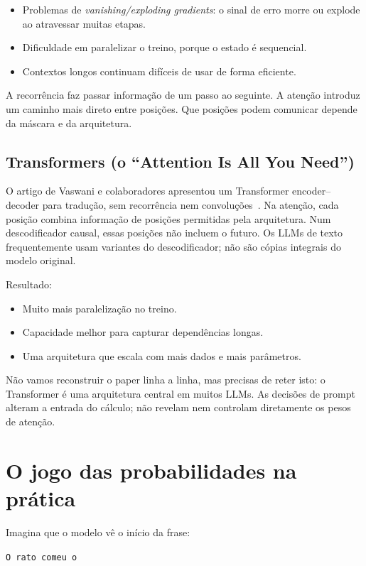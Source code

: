 \begin{itemize}[leftmargin=*]
\item Problemas de \emph{vanishing/exploding gradients}: o sinal de erro morre ou explode ao atravessar muitas etapas.
\item Dificuldade em paralelizar o treino, porque o estado é sequencial.
\item Contextos longos continuam difíceis de usar de forma eficiente.
\end{itemize}

A recorrência faz passar informação de um passo ao seguinte. A atenção introduz um caminho mais direto entre posições. Que posições podem comunicar depende da máscara e da arquitetura.

\subsection*{Transformers (o “Attention Is All You Need”)}

O artigo de Vaswani e colaboradores apresentou um Transformer encoder--decoder para tradução, sem recorrência nem convoluções~\citep{vaswani2017}. Na atenção, cada posição combina informação de posições permitidas pela arquitetura. Num descodificador causal, essas posições não incluem o futuro. Os LLMs de texto frequentemente usam variantes do descodificador; não são cópias integrais do modelo original.

Resultado:

\begin{itemize}[leftmargin=*]
\item Muito mais paralelização no treino.
\item Capacidade melhor para capturar dependências longas.
\item Uma arquitetura que escala com mais dados e mais parâmetros.
\end{itemize}

Não vamos reconstruir o paper linha a linha, mas precisas de reter isto: o Transformer é uma arquitetura central em muitos LLMs. As decisões de prompt alteram a entrada do cálculo; não revelam nem controlam diretamente os pesos de atenção.

\section{O jogo das probabilidades na prática}

Imagina que o modelo vê o início da frase:

\begin{center}
\texttt{O rato comeu o}
\end{center}

